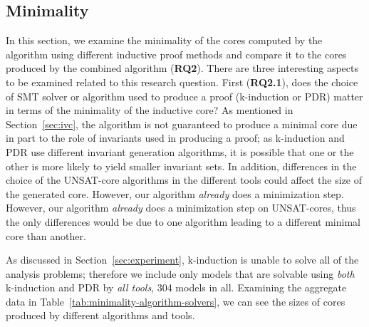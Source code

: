 \subsection{Minimality}
\label{sec:minimality}
In this section, we examine the minimality of the cores computed by the \ucalg algorithm using different inductive proof methods and compare it to the cores produced by the combined algorithm (\textbf{RQ2}).  There are three interesting aspects to be examined related to this research question.  First (\textbf{RQ2.1}), does the choice of SMT solver or algorithm used to produce a proof (k-induction or PDR) matter in terms of the minimality of the inductive core?   As mentioned in Section~\ref{sec:ivc}, the \ucalg algorithm is not guaranteed to produce a minimal core due in part to the role of invariants used in producing a proof; as k-induction and PDR use different invariant generation algorithms, it is possible that one or the other is more likely to yield smaller invariant sets.  In addition, differences in the choice of the UNSAT-core algorithms in the different tools could affect the size of the generated core.  However, our algorithm {\em already} does a minimization step.  However,
our algorithm {\em already} does a minimization step on UNSAT-cores,
thus the only differences would be due to one algorithm leading to a
different minimal core than another.

As discussed in Section~\ref{sec:experiment}, k-induction is unable to solve all of the analysis problems; therefore we include only models that are solvable using {\em both} k-induction and PDR by {\em all tools}, 304 models in all.  Examining the aggregate data in Table~\ref{tab:minimality-algorithm-solvers}, we can see the sizes of cores produced by different algorithms and tools.






